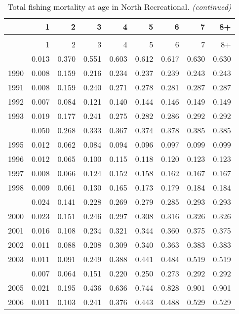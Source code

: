 \documentclass[
]{article}
\begin{document}
\begin{longtable}[t]{lrrrrrrrr}
\caption{\label{tab:North_Recreational-fleet-FAA-table}Total fishing mortality at age in North Recreational.}\\
\toprule
  & 1 & 2 & 3 & 4 & 5 & 6 & 7 & 8+\\
\midrule
\endfirsthead
\caption[]{Total fishing mortality at age in North Recreational. \textit{(continued)}}\\
\toprule
  & 1 & 2 & 3 & 4 & 5 & 6 & 7 & 8+\\
\midrule
\endhead

\endfoot
\bottomrule
\endlastfoot
1989 & 0.013 & 0.370 & 0.551 & 0.603 & 0.612 & 0.617 & 0.630 & 0.630\\
1990 & 0.008 & 0.159 & 0.216 & 0.234 & 0.237 & 0.239 & 0.243 & 0.243\\
1991 & 0.008 & 0.159 & 0.240 & 0.271 & 0.278 & 0.281 & 0.287 & 0.287\\
1992 & 0.007 & 0.084 & 0.121 & 0.140 & 0.144 & 0.146 & 0.149 & 0.149\\
1993 & 0.019 & 0.177 & 0.241 & 0.275 & 0.282 & 0.286 & 0.292 & 0.292\\
\addlinespace
1994 & 0.050 & 0.268 & 0.333 & 0.367 & 0.374 & 0.378 & 0.385 & 0.385\\
1995 & 0.012 & 0.062 & 0.084 & 0.094 & 0.096 & 0.097 & 0.099 & 0.099\\
1996 & 0.012 & 0.065 & 0.100 & 0.115 & 0.118 & 0.120 & 0.123 & 0.123\\
1997 & 0.008 & 0.066 & 0.124 & 0.152 & 0.158 & 0.162 & 0.167 & 0.167\\
1998 & 0.009 & 0.061 & 0.130 & 0.165 & 0.173 & 0.179 & 0.184 & 0.184\\
\addlinespace
1999 & 0.024 & 0.141 & 0.228 & 0.269 & 0.279 & 0.285 & 0.293 & 0.293\\
2000 & 0.023 & 0.151 & 0.246 & 0.297 & 0.308 & 0.316 & 0.326 & 0.326\\
2001 & 0.016 & 0.108 & 0.234 & 0.321 & 0.344 & 0.360 & 0.375 & 0.375\\
2002 & 0.011 & 0.088 & 0.208 & 0.309 & 0.340 & 0.363 & 0.383 & 0.383\\
2003 & 0.011 & 0.091 & 0.249 & 0.388 & 0.441 & 0.484 & 0.519 & 0.519\\
\addlinespace
2004 & 0.007 & 0.064 & 0.151 & 0.220 & 0.250 & 0.273 & 0.292 & 0.292\\
2005 & 0.021 & 0.195 & 0.436 & 0.636 & 0.744 & 0.828 & 0.901 & 0.901\\
2006 & 0.011 & 0.103 & 0.241 & 0.376 & 0.443 & 0.488 & 0.529 & 0.529\\

\end{longtable}
\end{document}
